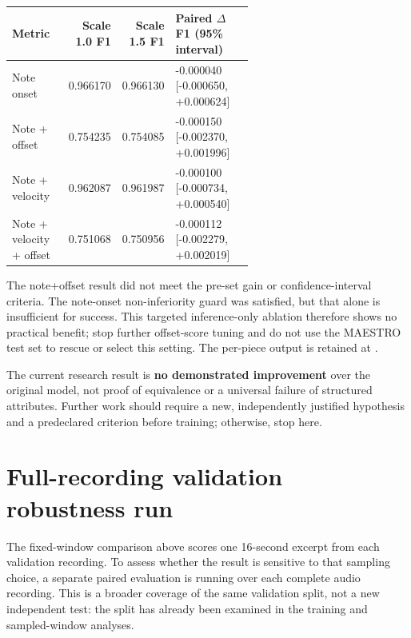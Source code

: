 \documentclass[11pt]{article}
\begin{document}
\begin{center}
\begin{tabular}{p{0.25\linewidth}rrp{0.35\linewidth}}
\toprule
\textbf{Metric} & \textbf{Scale 1.0 F1} & \textbf{Scale 1.5 F1} &
\textbf{Paired $\Delta$ F1 (95\% interval)} \\
\midrule
Note onset & 0.966170 & 0.966130 & -0.000040 [-0.000650, +0.000624] \\
Note + offset & 0.754235 & 0.754085 & -0.000150 [-0.002370, +0.001996] \\
Note + velocity & 0.962087 & 0.961987 & -0.000100 [-0.000734, +0.000540] \\
Note + velocity + offset & 0.751068 & 0.750956 & -0.000112 [-0.002279, +0.002019] \\
\bottomrule
\end{tabular}
\end{center}

The note+offset result did not meet the pre-set gain or confidence-interval
criteria. The note-onset non-inferiority guard was satisfied, but that alone
is insufficient for success. This targeted inference-only ablation therefore
shows no practical benefit; stop further offset-score tuning and do not use
the MAESTRO test set to rescue or select this setting. The per-piece output
is retained at
.

The current research result is \textbf{no demonstrated improvement} over the
original model, not proof of equivalence or a universal failure of structured
attributes. Further work should require a new, independently justified
hypothesis and a predeclared criterion before training; otherwise, stop here.

\section{Full-recording validation robustness run}

The fixed-window comparison above scores one 16-second excerpt from each
validation recording. To assess whether the result is sensitive to that
sampling choice, a separate paired evaluation is running over each complete
audio recording. This is a broader coverage of the same validation split,
not a new independent test: the split has already been examined in the
training and sampled-window analyses.
\end{document}
